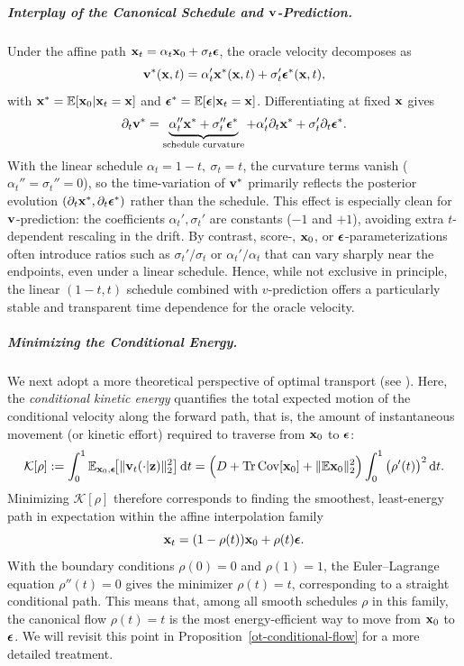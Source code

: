 \subparagraph{Interplay of the Canonical Schedule and ${\mathbf{v}}$-Prediction.}
Under the affine path ${\mathbf{x}}_t=\alpha_t {\mathbf{x}}_0+\sigma_t{\bm{\epsilon}}$, the oracle velocity decomposes as
\[
{\mathbf{v}}^*({\mathbf{x}}, t)=\alpha_t' {\mathbf{x}}^*({\mathbf{x}},t)+\sigma_t' {\bm{\epsilon}}^*({\mathbf{x}},t),
\]
with ${\mathbf{x}}^*=\mathbb{E}[{\mathbf{x}}_0|{\mathbf{x}}_t={\mathbf{x}}]$ and $ {\bm{\epsilon}}^*=\mathbb{E}[{\bm{\epsilon}}|{\mathbf{x}}_t={\mathbf{x}}]$.
Differentiating at fixed ${\mathbf{x}}$ gives
\[
\partial_t {\mathbf{v}}^*
=\underbrace{\alpha_t'' {\mathbf{x}}^*+\sigma_t'' {\bm{\epsilon}}^*}_{\text{schedule curvature}}
+ \alpha_t' \partial_t {\mathbf{x}}^*+\sigma_t' \partial_t {\bm{\epsilon}}^*.
\]
With the linear schedule $\alpha_t=1-t,\ \sigma_t=t$, the curvature terms vanish
($\alpha_t''=\sigma_t''=0$), so the time-variation of ${\mathbf{v}}^*$ primarily reflects the
posterior evolution $(\partial_t {\mathbf{x}}^*,\partial_t {\bm{\epsilon}}^*)$ rather than the schedule.
This effect is especially clean for ${\mathbf{v}}$-prediction: the coefficients $\alpha_t',\sigma_t'$
are constants ($-1$ and $+1$), avoiding extra $t$-dependent rescaling in the drift.
By contrast, score-, ${\mathbf{x}}_0$, or ${\bm{\epsilon}}$-parameterizations often introduce ratios such as
$\sigma_t'/\sigma_t$ or $\alpha_t'/\alpha_t$ that can vary sharply near the endpoints,
even under a linear schedule. Hence, while not exclusive in principle, the linear
$(1-t,t)$ schedule combined with $v$-prediction offers a particularly stable and
transparent time dependence for the oracle velocity.

\subparagraph{Minimizing the Conditional Energy.} We next adopt a more theoretical perspective of optimal transport (see ). 
Here, the \emph{conditional kinetic energy} quantifies the total expected motion 
of the conditional velocity along the forward path, that is,
the amount of instantaneous movement (or kinetic effort) required to traverse from 
${\mathbf{x}}_0$ to ${\bm{\epsilon}}$:
\[
\mathcal K[\rho]
:=\int_0^1 \mathbb{E}_{{\mathbf{x}}_0,{\bm{\epsilon}}}\!\big[\|{\mathbf{v}}_t(\cdot |{\mathbf{z}})\|_2^2\big]\mathop{}\!\mathrm{d} t
=\Big(D+\operatorname{Tr}\mathrm{Cov}[{\mathbf{x}}_0]+\|\mathbb{E}{\mathbf{x}}_0\|_2^2\Big)
\int_0^1 \big(\rho'(t)\big)^2\mathop{}\!\mathrm{d} t.
\]
Minimizing $\mathcal K[\rho]$ therefore corresponds to finding the smoothest, least-energy
path in expectation within the affine interpolation family
\[
{\mathbf{x}}_t=(1-\rho(t)){\mathbf{x}}_0+\rho(t){\bm{\epsilon}}.
\]
With the boundary conditions $\rho(0)=0$ and $\rho(1)=1$, the
Euler--Lagrange equation $\rho''(t)=0$ gives the minimizer $\rho(t)=t$, corresponding to a
straight conditional path. This means that, among all smooth schedules $\rho$ in this family,
the canonical flow $\rho(t)=t$ is the most energy-efficient way to move from ${\mathbf{x}}_0$ to
${\bm{\epsilon}}$. We will revisit this point in Proposition~\ref{ot-conditional-flow}
for a more detailed treatment.


